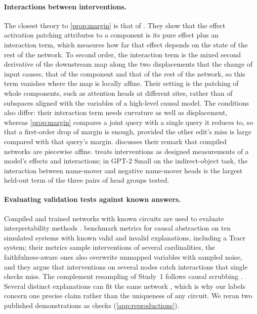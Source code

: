 \paragraph{Interactions between interventions.}
The closest theory to \cref{prop:margin} is that of \citet{vaidyanathan2026mediators}. They show that the effect
activation patching attributes to a component is its pure effect plus an interaction term, which measures how far
that effect depends on the state of the rest of the network. To second order, the interaction term is the mixed
second derivative of the downstream map along the two displacements that the change of input causes, that of the
component and that of the rest of the network, so this term vanishes where the map is locally affine. Their setting
is the patching of whole components, such as attention heads at different sites, rather than of subspaces aligned
with the variables of a high-level causal model. The conditions also differ: their interaction term needs curvature
as well as displacement, whereas \cref{prop:margin} compares a joint query with a single query it reduces to, so that
a first-order drop of margin is enough, provided the other edit's miss is large compared with that query's margin.
 discusses their remark that compiled networks are piecewise affine.
\citet{erramilli2026tomography} treats interventions as designed measurements of a model's effects and interactions;
in GPT-2 Small on the indirect-object task, the interaction between name-mover and negative name-mover heads is the
largest held-out term of the three pairs of head groups tested.

\paragraph{Evaluating validation tests against known answers.}
Compiled and trained networks with known circuits are used to evaluate interpretability methods
\citep{lindner2023tracr,conmy2023acdc,gupta2024interpbench,thurnherr2024tracrbench}. \citet{meloux2026validating}
benchmark metrics for causal abstraction on ten simulated systems with known valid and invalid explanations,
including a Tracr system; their metrics sample interventions of several cardinalities, the faithfulness-aware ones
also overwrite unmapped variables with sampled noise, and they argue that interventions on several nodes catch
interactions that single checks miss. The complement resampling of Study~1 follows causal scrubbing
\citep{chan2022scrubbing}. Several distinct explanations can fit the same network
\citep{meloux2025identifiable,chen2026rome}, which is why our labels concern one precise claim rather than the
uniqueness of any circuit. We reran two published demonstrations as checks (\cref{app:reproductions}).
